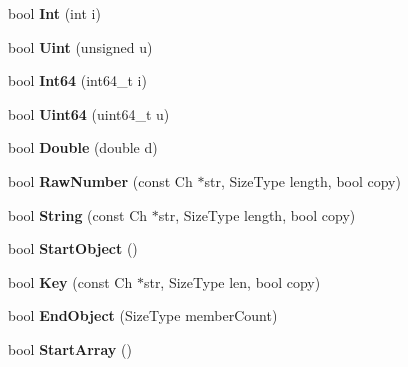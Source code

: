 \begin{DoxyCompactItemize}
bool {\bfseries Int} (int i)
\item 
\mbox{\label{classGenericSchemaValidator_aa688665c5274f93543c84a4b6cabe8da}} 
bool {\bfseries Uint} (unsigned u)
\item 
\mbox{\label{classGenericSchemaValidator_ac5a9e416e18129a7b787f251019a828f}} 
bool {\bfseries Int64} (int64\+\_\+t i)
\item 
\mbox{\label{classGenericSchemaValidator_abfc56c58cf0b65318e376fc5f2879292}} 
bool {\bfseries Uint64} (uint64\+\_\+t u)
\item 
\mbox{\label{classGenericSchemaValidator_aed0532dbda3ac6f3ca7196af06066b86}} 
bool {\bfseries Double} (double d)
\item 
\mbox{\label{classGenericSchemaValidator_ae4f024145421d2c1dde08a9de528722a}} 
bool {\bfseries Raw\+Number} (const Ch $\ast$str, Size\+Type length, bool copy)
\item 
\mbox{\label{classGenericSchemaValidator_a33cf3f83307a8fea38c3238ef75c3d58}} 
bool {\bfseries String} (const Ch $\ast$str, Size\+Type length, bool copy)
\item 
\mbox{\label{classGenericSchemaValidator_a59972d612c3d37aae9a30222e428d216}} 
bool {\bfseries Start\+Object} ()
\item 
\mbox{\label{classGenericSchemaValidator_a6d08b458216ec4a09eed9d94800d05c1}} 
bool {\bfseries Key} (const Ch $\ast$str, Size\+Type len, bool copy)
\item 
\mbox{\label{classGenericSchemaValidator_aa89e14f0f731f6acdec22a0f7e003037}} 
bool {\bfseries End\+Object} (Size\+Type member\+Count)
\item 
\mbox{\label{classGenericSchemaValidator_aba13751f802531ed8cbd850778ea993c}} 
bool {\bfseries Start\+Array} ()
\item 
\mbox{\label{classGenericSchemaValidator_a67b501f0f65d40e0086ca8216882b34f}} 

\end{DoxyCompactItemize}
